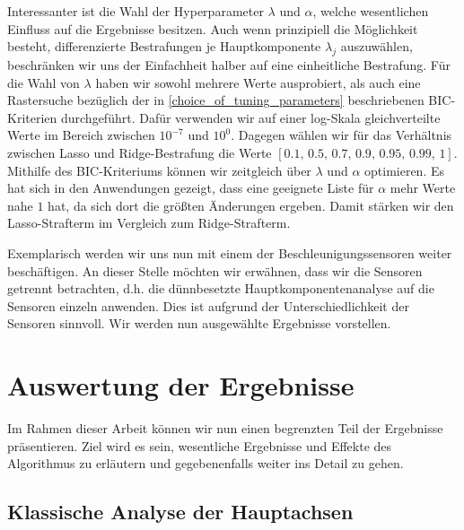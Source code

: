 Interessanter ist die Wahl der Hyperparameter $\lambda$ und $\alpha$, welche wesentlichen Einfluss auf die Ergebnisse besitzen. Auch wenn prinzipiell die Möglichkeit besteht, differenzierte Bestrafungen je Hauptkomponente $\lambda_j$ auszuwählen, beschränken wir uns der Einfachheit halber auf eine einheitliche Bestrafung. Für die Wahl von $\lambda$ haben wir sowohl mehrere Werte ausprobiert, als auch eine Rastersuche bezüglich der in \ref{choice_of_tuning_parameters} beschriebenen BIC-Kriterien durchgeführt. Dafür verwenden wir auf einer log-Skala gleichverteilte Werte im Bereich zwischen $10^{-7}$ und $10^0$. Dagegen wählen wir für das Verhältnis zwischen Lasso und Ridge-Bestrafung die Werte $[0.1,\, 0.5,\, 0.7,\, 0.9,\, 0.95,\, 0.99,\, 1]$. Mithilfe des BIC-Kriteriums können wir zeitgleich über $\lambda$ und $\alpha$ optimieren. Es hat sich in den Anwendungen gezeigt, dass eine geeignete Liste für $\alpha$ mehr Werte nahe $1$ hat, da sich dort die größten Änderungen ergeben. Damit stärken wir den Lasso-Strafterm im Vergleich zum Ridge-Strafterm.

Exemplarisch werden wir uns nun mit einem der Beschleunigungssensoren weiter beschäftigen. An dieser Stelle möchten wir erwähnen, dass wir die Sensoren getrennt betrachten, d.h. die dünnbesetzte Hauptkomponentenanalyse auf die Sensoren einzeln anwenden. Dies ist aufgrund der Unterschiedlichkeit der Sensoren sinnvoll. Wir werden nun ausgewählte Ergebnisse vorstellen. 




\section{Auswertung der Ergebnisse}
\label{evaluation}

Im Rahmen dieser Arbeit können wir nun einen begrenzten Teil der Ergebnisse präsentieren. Ziel wird es sein, wesentliche Ergebnisse und Effekte des Algorithmus zu erläutern und gegebenenfalls weiter ins Detail zu gehen. 




\subsection{Klassische Analyse der Hauptachsen}

